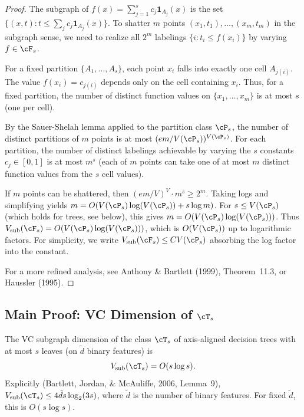 \documentclass[12pt]{article}
\begin{document}
\begin{proof}
The subgraph of $f(x) = \sum_{j=1}^s c_j \mathbf{1}_{A_j}(x)$ is the set $\{(x,t) : t \le \sum_j c_j \mathbf{1}_{A_j}(x)\}$. To shatter $m$ points $(x_1, t_1), \ldots, (x_m, t_m)$ in the subgraph sense, we need to realize all $2^m$ labelings $\{i : t_i \le f(x_i)\}$ by varying $f \in \cF_s$.

For a fixed partition $\{A_1, \ldots, A_s\}$, each point $x_i$ falls into exactly one cell $A_{j(i)}$. The value $f(x_i) = c_{j(i)}$ depends only on the cell containing $x_i$. Thus, for a fixed partition, the number of distinct function values on $\{x_1, \ldots, x_m\}$ is at most $s$ (one per cell).

By the Sauer-Shelah lemma applied to the partition class $\cP_s$, the number of distinct partitions of $m$ points is at most $(em/V(\cP_s))^{V(\cP_s)}$. For each partition, the number of distinct labelings achievable by varying the $s$ constants $c_j \in [0,1]$ is at most $m^s$ (each of $m$ points can take one of at most $m$ distinct function values from the $s$ cell values).

If $m$ points can be shattered, then $(em/V)^V \cdot m^s \ge 2^m$. Taking logs and simplifying yields $m = O(V(\cP_s) \log(V(\cP_s)) + s \log m)$. For $s \le V(\cP_s)$ (which holds for trees, see below), this gives $m = O(V(\cP_s) \log(V(\cP_s)))$. Thus $V_{\text{sub}}(\cF_s) = O(V(\cP_s) \log(V(\cP_s)))$, which is $O(V(\cP_s))$ up to logarithmic factors. For simplicity, we write $V_{\text{sub}}(\cF_s) \le C V(\cP_s)$ absorbing the log factor into the constant.

For a more refined analysis, see Anthony \& Bartlett (1999), Theorem~11.3, or Haussler (1995).
\end{proof}

\subsection{Main Proof: VC Dimension of $\cT_s$}

\begin{theorem}
\label{thm:vc-trees-app}
The VC subgraph dimension of the class $\cT_s$ of axis-aligned decision trees with at most $s$ leaves (on $\tilde{d}$ binary features) is
\[
V_{\text{sub}}(\cT_s) = O(s \log s).
\]
Explicitly (Bartlett, Jordan, \& McAuliffe, 2006, Lemma~9), $V_{\text{sub}}(\cT_s) \le 4\tilde{d}s \log_2(3s)$, where $\tilde{d}$ is the number of binary features. For fixed $\tilde{d}$, this is $O(s \log s)$.
\end{theorem}
\end{document}
